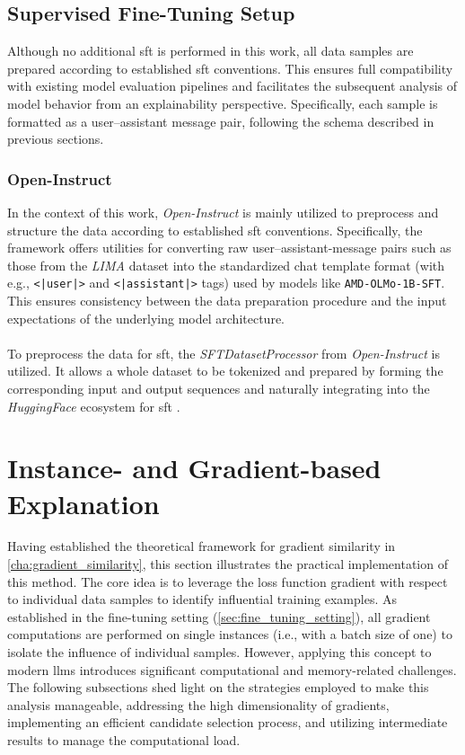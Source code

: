 \subsection{Supervised Fine-Tuning Setup}
Although no additional \acrfull{sft} is performed in this work, all data samples are prepared according to established \acrshort{sft} conventions. This ensures full compatibility with existing model evaluation pipelines and facilitates the subsequent analysis of model behavior from an explainability perspective. Specifically, each sample is formatted as a user–assistant message pair, following the schema described in previous sections.

\subsubsection{Open-Instruct}
In the context of this work, \emph{Open-Instruct} is mainly utilized to preprocess and structure the data according to established \acrshort{sft} conventions. Specifically, the framework offers utilities for converting raw user–assistant-message pairs such as those from the \emph{LIMA} dataset into the standardized chat template format (with e.g., \texttt{<|user|>} and \texttt{<|assistant|>} tags) used by models like \texttt{AMD-OLMo-1B-SFT}. This ensures consistency between the data preparation procedure and the input expectations of the underlying model architecture.
\\\\
To preprocess the data for \acrfull{sft}, the \emph{SFTDatasetProcessor} from \emph{Open-Instruct} is utilized. It allows a whole dataset to be tokenized and prepared by forming the corresponding input and output sequences and naturally integrating into the \emph{HuggingFace} ecosystem for \acrshort{sft} \cite{DBLP:conf/nips/WangIDHKCWMSBH23}.

\section{Instance- and Gradient-based Explanation}
Having established the theoretical framework for gradient similarity in \autoref{cha:gradient_similarity}, this section illustrates the practical implementation of this method. The core idea is to leverage the loss function gradient with respect to individual data samples to identify influential training examples. As established in the fine-tuning setting (\autoref{sec:fine_tuning_setting}), all gradient computations are performed on single instances (i.e., with a batch size of one) to isolate the influence of individual samples. However, applying this concept to modern \acrlong{llm}s introduces significant computational and memory-related challenges. The following subsections shed light on the strategies employed to make this analysis manageable, addressing the high dimensionality of gradients, implementing an efficient candidate selection process, and utilizing intermediate results to manage the computational load.

